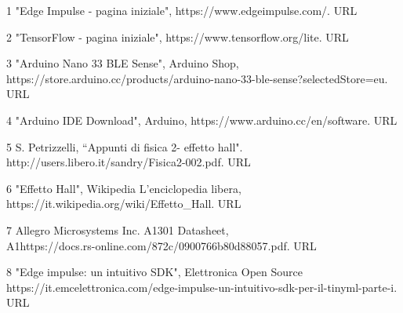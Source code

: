 

\newcommand{\bibNum}[1]{\noindent{}\textbf{\lbrack{}}#1\textbf{\rbrack{}}}


\label{100-chapter}

\bibNum{1}  "Edge Impulse - pagina iniziale", https://www.edgeimpulse.com/. URL

\bibNum{2} "TensorFlow - pagina iniziale", https://www.tensorflow.org/lite. URL

\bibNum{3} "Arduino Nano 33 BLE Sense", Arduino Shop,\\ \indent{}https://store.arduino.cc/products/arduino-nano-33-ble-sense?selectedStore=eu. URL

\bibNum{4} "Arduino IDE Download", Arduino, https://www.arduino.cc/en/software. URL

\bibNum{5} S. Petrizzelli, “Appunti di fisica 2- effetto hall".\\
\indent{}http://users.libero.it/sandry/Fisica2-002.pdf. URL\

\bibNum{6} "Effetto Hall", Wikipedia L'enciclopedia libera, \\
\indent{}https://it.wikipedia.org/wiki/Effetto\_Hall. URL

\bibNum{7} Allegro Microsystems Inc. A1301 Datasheet, \\
\indent{}A1https://docs.rs-online.com/872c/0900766b80d88057.pdf. URL

\bibNum{8} "Edge impulse: un intuitivo SDK", Elettronica Open Source\\ \indent{}https://it.emcelettronica.com/edge-impulse-un-intuitivo-sdk-per-il-tinyml-parte-i. URL
